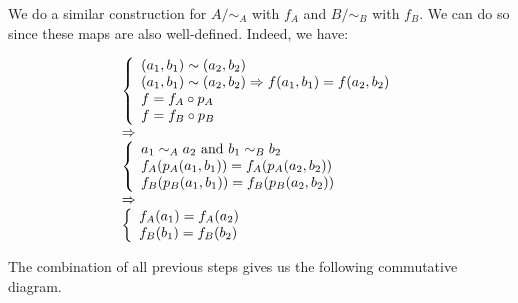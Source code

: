 We do a similar construction for $A/\sim_A$ with $f_A$ and $B/\sim_B$ with $f_B$. We can do so since these maps are also well-defined. Indeed, we have:

$$
\begin{array}{l}
	\left\{
	\begin{array}{l}
		(a_1, b_1) \sim (a_2, b_2) \\
		(a_1, b_1) \sim (a_2, b_2) \Rightarrow f(a_1, b_1) = f(a_2, b_2) \\
		f = f_A \circ p_A \\
		f = f_B \circ p_B
	\end{array}
	\right.
\cr \Rightarrow \\
	\left\{
	\begin{array}{l}
		a_1 \sim_A a_2 \text{ and } b_1 \sim_B b_2 \\
		f_A(p_A(a_1, b_1)) = f_A(p_A(a_2, b_2)) \\
		f_B(p_B(a_1, b_1)) = f_B(p_B(a_2, b_2)) 
	\end{array}
	\right.
\cr \Rightarrow \\
	\left\{
	\begin{array}{l}
		f_A(a_1) = f_A(a_2) \\
		f_B(b_1) = f_B(b_2) 
	\end{array}
	\right.
\end{array}
$$

The combination of all previous steps gives us the following commutative diagram.

